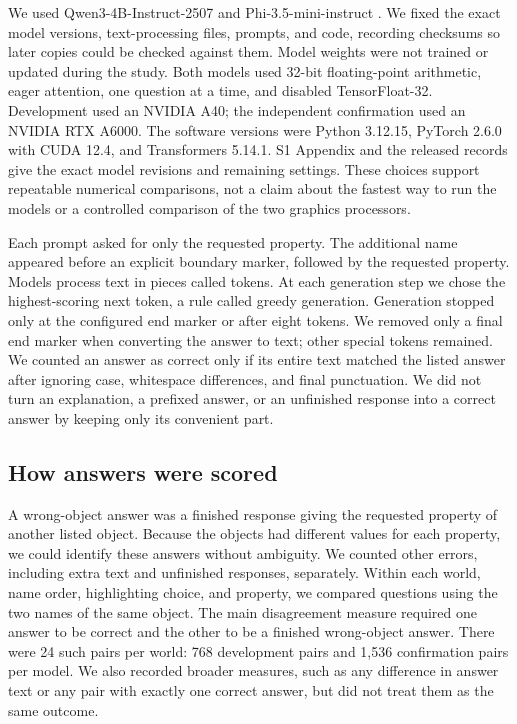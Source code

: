 \documentclass[10pt,letterpaper]{article}
\begin{document}
We used Qwen3-4B-Instruct-2507 and Phi-3.5-mini-instruct \cite{qwenmodel,phimodel}. We fixed the exact model versions, text-processing files, prompts, and code, recording checksums so later copies could be checked against them. Model weights were not trained or updated during the study. Both models used 32-bit floating-point arithmetic, eager attention, one question at a time, and disabled TensorFloat-32. Development used an NVIDIA A40; the independent confirmation used an NVIDIA RTX A6000. The software versions were Python 3.12.15, PyTorch 2.6.0 with CUDA 12.4, and Transformers 5.14.1. S1 Appendix and the released records give the exact model revisions and remaining settings. These choices support repeatable numerical comparisons, not a claim about the fastest way to run the models or a controlled comparison of the two graphics processors.


Each prompt asked for only the requested property. The additional name appeared before an explicit boundary marker, followed by the requested property. Models process text in pieces called tokens. At each generation step we chose the highest-scoring next token, a rule called greedy generation. Generation stopped only at the configured end marker or after eight tokens. We removed only a final end marker when converting the answer to text; other special tokens remained. We counted an answer as correct only if its entire text matched the listed answer after ignoring case, whitespace differences, and final punctuation. We did not turn an explanation, a prefixed answer, or an unfinished response into a correct answer by keeping only its convenient part.


\subsection*{How answers were scored}

A wrong-object answer was a finished response giving the requested property of another listed object. Because the objects had different values for each property, we could identify these answers without ambiguity. We counted other errors, including extra text and unfinished responses, separately. Within each world, name order, highlighting choice, and property, we compared questions using the two names of the same object. The main disagreement measure required one answer to be correct and the other to be a finished wrong-object answer. There were 24 such pairs per world: 768 development pairs and 1,536 confirmation pairs per model. We also recorded broader measures, such as any difference in answer text or any pair with exactly one correct answer, but did not treat them as the same outcome.
\end{document}

